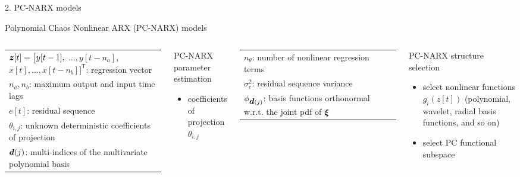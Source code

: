 \documentclass[10pt,xcolor = dvipsnames]{beamer}
\newcommand{\vc}[1]{\vspace*{#1cm}}
\newcommand{\bld}[1]{\mbox{\boldmath $#1$}}
\newcommand{\bxi}{\bld{\xi}}
\newcommand{\Red}{\color{red}}
\begin{document}
\begin{frame}{2. PC-NARX models}
\begin{block}{Polynomial Chaos Nonlinear ARX (PC-NARX) models}
\begin{columns}


\tiny 
\begin{tabular}{l}
{\Red ${\bld z}[t] = \bigl[ y[t-1],$ $\ldots, y[t-n_a], $ $x[t],\ldots ,x[t-n_b] \bigr]^\mathsf{T}$}: regression vector \\
 {\Red $n_a, n_b$}: maximum output and input time lags  \\  
{\Red $e[t]$}: residual sequence \\
{\Red $\theta_{i,j}$}: unknown deterministic coefficients of projection \\
{\Red ${\bld d}{(j)}$}: multi-indices of the multivariate polynomial basis \\ 
\end{tabular} 

\begin{block}{\small PC-NARX parameter estimation}
\begin{itemize}
\item{\footnotesize coefficients of projection $\theta_{i,j}$}
\end{itemize}
\end{block}
\vc{1.25}

\tiny 
\begin{tabular}{l}
{\Red $n_\theta$}: number of nonlinear regression terms \\  
{\Red $\sigma_e^2$}: residual sequence variance \\
{\Red $\phi_{{\bld d}(j)}$}: basis functions orthonormal w.r.t. the joint pdf of $\bxi$ \\ 
\end{tabular} 

\begin{block}{\small PC-NARX structure selection}
\begin{itemize}
\item{\footnotesize select nonlinear functions $g_i(z[t])$ (polynomial, wavelet, radial basis functions, and so on)}
\item{\footnotesize select PC functional subspace}
\end{itemize}
\end{block}
\end{columns}


\end{block}

\end{frame}
\end{document}
